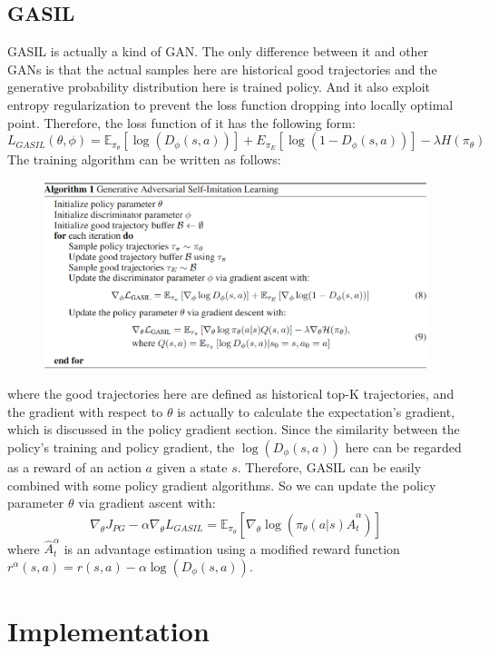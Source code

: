 \documentclass[UTF8, a4paper, 11pt]{article}
\begin{document}
\subsection{GASIL}
GASIL is actually a kind of GAN. The only difference between it and other GANs is that the actual samples here are historical good trajectories and the generative
probability distribution here is trained policy. And it also exploit entropy regularization to prevent the loss function dropping into locally optimal point.
Therefore, the loss function of it has the following form:
$$L_{GASIL}(\theta,\phi)=\mathbb{E}_{\pi_\theta}[\log(D_{\phi}(s,a))]+E_{\pi_E}[\log(1-D_\phi(s,a))]-\lambda H(\pi_\theta)$$
The training algorithm can be written as follows:
\begin{figure}[H]
    \centering
    \includegraphics[width = \textwidth]{algorithm.png}
\end{figure}
where the good trajectories here are defined as historical top-K trajectories, and the gradient with respect to $\theta$ is actually to calculate the expectation's
gradient, which is discussed in the policy gradient section. Since the similarity between the policy's training and policy gradient, the $\log(D_\phi(s,a))$ here can be
regarded as a reward of an action $a$ given a state $s$. Therefore, GASIL can be easily combined with some policy gradient algorithms. So we can update the policy
parameter $\theta$ via gradient ascent with:
$$\nabla_\theta J_{PG}-\alpha\nabla_\theta L_{GASIL}=\mathbb{E}_{\pi_\theta}[\nabla_\theta\log(\pi_\theta(a|s)\hat A_t^\alpha)]$$
where $\hat A_t^\alpha$ is an advantage estimation using a modified reward function $r^\alpha(s,a)=r(s,a)-\alpha\log(D_\phi(s,a))$.
\section{Implementation}
\end{document}
